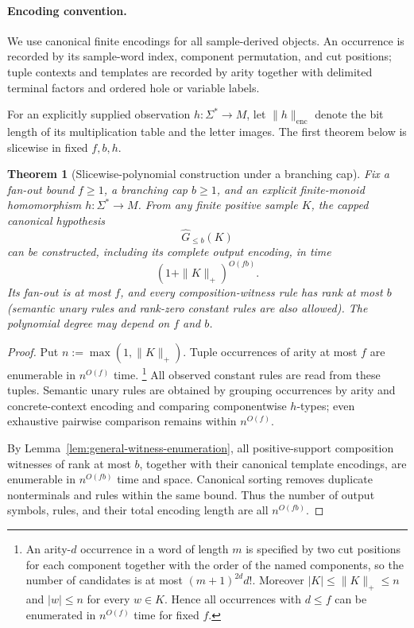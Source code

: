 \documentclass[11pt,a4paper]{article}
\numberwithin{equation}{section}
\theoremstyle{plain}
\newtheorem{theorem}{Theorem}[section]
\theoremstyle{definition}
\theoremstyle{remark}
\begin{document}
\paragraph{Encoding convention.}
We use canonical finite encodings for all sample-derived objects.  An occurrence is
recorded by its sample-word index, component permutation, and cut positions;
tuple contexts and templates are recorded by arity together with delimited
terminal factors and ordered hole or variable labels.

For an explicitly supplied observation \(h:\Sigma^*\to M\), let
\(\|h\|_{\mathrm{enc}}\) denote the bit length of its multiplication table and
the letter images.  The first theorem below is slicewise in fixed \(f,b,h\).

\begin{theorem}[Slicewise-polynomial construction under a branching cap]
\label{thm:poly}
Fix a fan-out bound \(f\ge1\), a branching cap \(b\ge1\), and an explicit
finite-monoid homomorphism \(h:\Sigma^*\to M\).  From any finite positive
sample \(K\), the capped canonical hypothesis
\[
  \widehat G_{\le b}(K)
\]
can be constructed, including its complete output encoding, in time
\[
  (1+\|K\|_+)^{O(fb)}.
\]
Its fan-out is at most \(f\), and every composition-witness rule has rank at
most \(b\) (semantic unary rules and rank-zero constant rules are also
allowed).  The polynomial degree may depend on \(f\) and \(b\).
\end{theorem}

\begin{proof}
Put \(n:=\max(1,\|K\|_+)\).  Tuple occurrences of arity at most \(f\) are
enumerable in \(n^{O(f)}\) time.%
\footnote{An arity-\(d\) occurrence in a word of length \(m\) is specified by
two cut positions for each component together with the order of the named
components, so the number of candidates is at most
\((m+1)^{2d}d!\).  Moreover \(|K|\le\|K\|_+\le n\) and
\(|w|\le n\) for every \(w\in K\).  Hence all occurrences with
\(d\le f\) can be enumerated in \(n^{O(f)}\) time for fixed \(f\).}  All observed constant rules are read from
these tuples.  Semantic unary rules are obtained by grouping occurrences by
arity and concrete-context encoding and comparing componentwise \(h\)-types;
even exhaustive pairwise comparison remains within \(n^{O(f)}\).

By Lemma~\ref{lem:general-witness-enumeration}, all positive-support composition
witnesses of rank at most \(b\), together with their canonical template
encodings, are enumerable in \(n^{O(fb)}\) time and space.  Canonical sorting
removes duplicate nonterminals and rules within the same bound.  Thus the
number of output symbols, rules, and their total encoding length are all
\(n^{O(fb)}\).
\end{proof}
\end{document}
